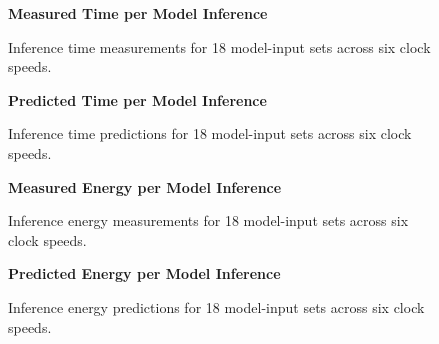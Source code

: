 


\begin{figure}[htbp]
    \centering
    \parbox{1.1\textwidth}{\centering\textbf{Measured Time per Model Inference}}
    \caption{Inference time measurements for 18 model-input sets across six clock speeds.}
    \label{fig:grpfmtimeinf}
    \vspace{0.2cm}
    \parbox{1.1\textwidth}{\centering\textbf{Predicted Time per Model Inference}}
    \caption{Inference time predictions for 18 model-input sets across six clock speeds.}
    \label{fig:gprpredtimeinf}
\end{figure}


\begin{figure}[htbp]
    \centering
    \parbox{1.1\textwidth}{\centering\textbf{Measured Energy per Model Inference}}
    \caption{Inference energy measurements for 18 model-input sets across six clock speeds.}
    \label{fig:grpfmenergyinf}
    \vspace{0.2cm}
    \parbox{1.1\textwidth}{\centering\textbf{Predicted Energy per Model Inference}}
    \caption{Inference energy predictions for 18 model-input sets across six clock speeds.}
    \label{fig:fprpredenergyinf}
\end{figure}


